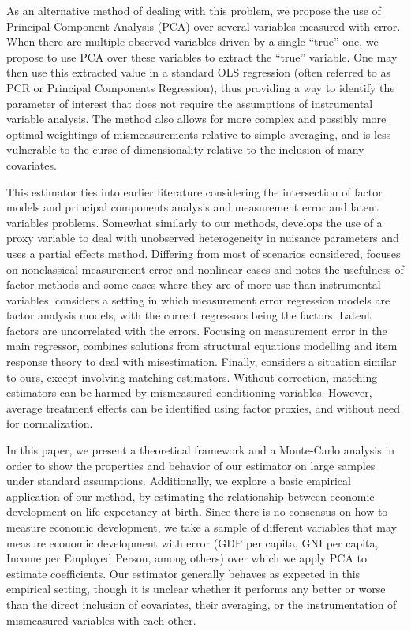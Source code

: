 \documentclass[10pt]{article}
\begin{document}
        As an alternative method of dealing with this problem, we propose the use of Principal Component Analysis (PCA) over several variables measured with error. When there are multiple observed variables driven by a single ``true'' one, we propose to use PCA over these variables to extract the ``true'' variable. One may then use this extracted value in a standard OLS regression (often referred to as PCR or Principal Components Regression), thus providing a way to identify the parameter of interest that does not require the assumptions of instrumental variable analysis. The method also allows for more complex and possibly more optimal weightings of mismeasurements relative to simple averaging, and is less vulnerable to the curse of dimensionality relative to the inclusion of many covariates.

        This estimator ties into earlier literature considering the intersection of factor models and principal components analysis and measurement error and latent variables problems. Somewhat similarly to our methods, \cite{nagasawa_identication_2020} develops the use of a proxy variable to deal with unobserved heterogeneity in nuisance parameters and uses a partial effects method. Differing from most of scenarios considered, \cite{schennach_recent_2016} focuses on nonclassical measurement error and nonlinear cases and notes the usefulness of factor methods and some cases where they are of more use than instrumental variables. \cite{wegge_local_1996} considers a setting in which measurement error regression models are factor analysis models, with the correct regressors being the factors. Latent factors are uncorrelated with the errors. Focusing on measurement error in the main regressor, \cite{schofield_correcting_2015} combines solutions from structural equations modelling and item response theory to deal with misestimation. Finally, \cite{heckman_matching_2010} considers a situation similar to ours, except involving matching estimators. Without correction, matching estimators can be harmed by mismeasured conditioning variables. However, average treatment effects can be identified using factor proxies, and without need for normalization.

        In this paper, we present a theoretical framework and a Monte-Carlo analysis in order to show the properties and behavior of our estimator on large samples under standard assumptions. Additionally, we explore a basic empirical application of our method, by estimating the relationship between economic development on life expectancy at birth. Since there is no consensus on how to measure economic development, we take a sample of different variables that may measure economic development with error (GDP per capita, GNI per capita, Income per Employed Person, among others) over which we apply PCA to estimate coefficients. Our estimator generally behaves as expected in this empirical setting, though it is unclear whether it performs any better or worse than the direct inclusion of covariates, their averaging, or the instrumentation of mismeasured variables with each other.
\end{document}

